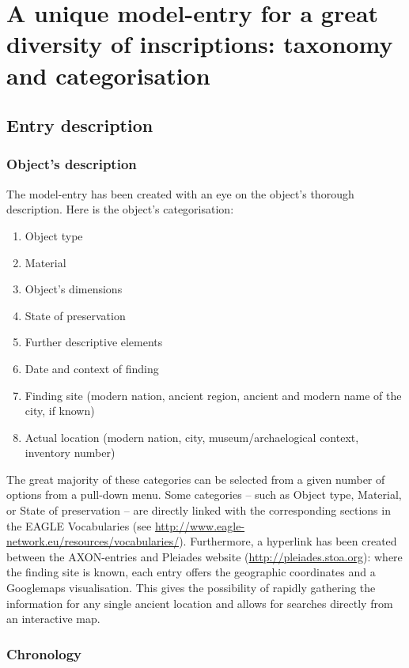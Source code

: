 \documentclass[amsthm,ebook]{saparticle}
\begin{document}
\section{A unique model-entry for a great diversity of inscriptions: taxonomy and categorisation}





\subsection{Entry description}

\subsubsection{Object’s description}


The model-entry has been created with an eye on the object’s thorough description. Here is the object’s categorisation:

\begin{enumerate}
\item Object type
\item Material
\item Object’s dimensions
\item State of preservation
\item Further descriptive elements
\item Date and context of finding
\item Finding site (modern nation, ancient region, ancient and modern name of the city, if known)
\item Actual location (modern nation, city, museum/archaelogical context, inventory number)
\end{enumerate}
The great majority of these categories can be selected from a given number of options from a pull-down menu. Some
categories – such as Object type, Material, or State of preservation – are directly linked with the corresponding
sections in the EAGLE Vocabularies (see \url{http://www.eagle-network.eu/resources/vocabularies/}). Furthermore, a hyperlink
has been created between the AXON-entries and Pleiades website (\url{http://pleiades.stoa.org}): where the finding site is
known, each entry offers the geographic coordinates and a Googlemaps visualisation. This gives the possibility of
rapidly gathering the information for any single ancient location and allows for searches directly from an interactive
map.




\subsubsection{Chronology}
\end{document}
